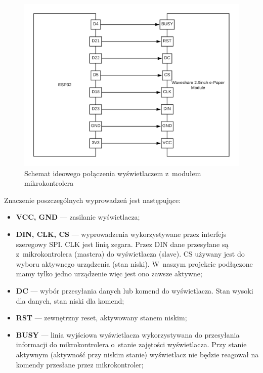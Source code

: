 \documentclass[a4paper,12pt, twoside]{article}
\begin{document}
\begin{enumerate}
            \begin{figure}[H]
    	        \centering
    			\includegraphics[width=12cm]{images/schemat_polaczenia_mikro_z_wyswietlaczem.png}
    			\caption{Schemat ideowego połączenia wyświetlaczem z~modułem mikrokontrolera}
                \label{fig:polecznie_mikro_z_epapierem}
    	    \end{figure}
        
            Znaczenie poszczególnych wyprowadzeń jest następujące: 
            \begin{itemize}
                \item \textbf{VCC, GND} — zasilanie wyświetlacza;
                \item \textbf{DIN, CLK, CS} — wyprowadzenia wykorzystywane przez interfejs szeregowy SPI. CLK jest linią zegara. Przez DIN dane przesyłane są z~mikrokontrolera (mastera) do wyświetlacza (slave). CS używany jest do wyboru aktywnego urządzenia (stan niski). W~naszym projekcie podłączone mamy tylko jedno urządzenie więc jest ono zawsze aktywne;
                \item \textbf{DC} — wybór przesyłania danych lub komend do wyświetlacza. Stan wysoki dla danych, stan niski dla komend;
                \item \textbf{RST} — zewnętrzny reset, aktywowany stanem niskim;
                \item \textbf{BUSY}  — linia wyjściowa wyświetlacza wykorzystywana do przesyłania informacji do mikrokontrolera o~stanie zajętości wyświetlacza. Przy stanie aktywnym (aktywność przy niskim stanie) wyświetlacz nie będzie reagował na komendy przesłane przez mikrokontroler; 
            \end{itemize}
        \end{enumerate}
        
\end{document}
